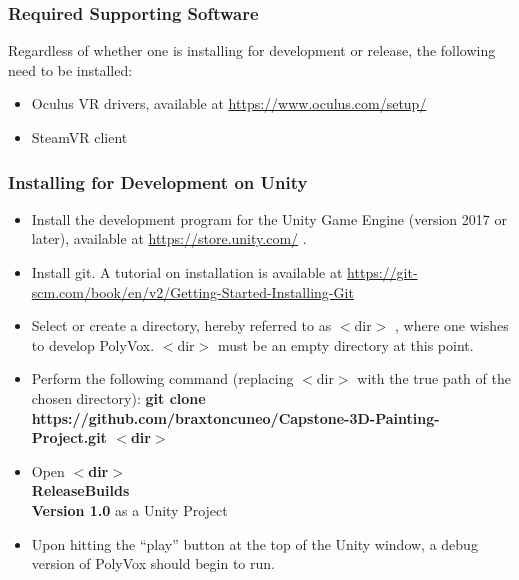 \documentclass[onecolumn, draftclsnofoot,10pt, compsoc]{IEEEtran}
\begin{document}
\subsubsection{Required Supporting Software}
Regardless of whether one is installing for development or release, the following need to be installed:
\begin{itemize}
\item Oculus VR drivers, available at \url{https://www.oculus.com/setup/}
\item SteamVR client
\end{itemize}
\subsubsection{Installing for Development on Unity}
\begin{itemize}
\item Install the development program for the Unity Game Engine (version 2017 or later), available at \url{https://store.unity.com/} .
\item Install git. A tutorial on installation is available at \url{https://git-scm.com/book/en/v2/Getting-Started-Installing-Git}
\item Select or create a directory, hereby referred to as $<$dir$>$ , where one wishes to develop PolyVox. $<$dir$>$ must be an empty directory at this point.
\item Perform the following command (replacing $<$dir$>$ with the true path of the chosen directory): \textbf{git clone https://github.com/braxtoncuneo/Capstone-3D-Painting-Project.git $<$dir$>$}
\item Open \textbf{ $<$dir$>$ \\ReleaseBuilds\\Version 1.0} as a Unity Project
\item Upon hitting the “play” button at the top of the Unity window, a debug version of PolyVox should begin to run.
\end{itemize}
\end{document}

